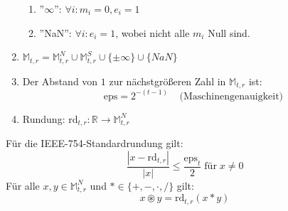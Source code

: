 \documentclass[4pt,a4paper]{scrartcl}
\begin{document}
\begin{multicols}{4}
\begin{enumerate}[label=$\bullet$]
\begin{enumerate}[label=-]
\item ''$\infty$'': $\forall i: m_i=0, e_i=1$
\item ''NaN'': $\forall i: e_i=1$, wobei nicht alle $m_i$ Null sind.
\end{enumerate}
\item $\mathbb{M}_{t,r}=\mathbb{M}_{t,r}^N\cup\mathbb{M}_{t,r}^S\cup\{\pm\infty\}\cup\{NaN\}$
\item Der Abstand von $1$ zur nächstgrößeren Zahl in $\mathbb{M}_{t,r}$ ist:
\begin{equation*}
\text{eps}=2^{-(t-1)}\;\;\;\;\text{(Maschinengenauigkeit)}
\end{equation*}
\item Rundung: $\text{rd}_{t,r}:\mathbb{R}\rightarrow\mathbb{M}_{t,r}^N$
\end{enumerate}
Für die IEEE-754-Standardrundung gilt:
\begin{equation*}
\frac{|x-\text{rd}_{t,r}|}{|x|}\leq\frac{\text{eps}_t}{2}\;\text{für}\;x\neq 0
\end{equation*}
Für alle $x,y\in\mathbb{M}_{t,r}^N$ und $*\in\{+,-,\cdot,/\}$ gilt:
\begin{equation*}
x\circledast y=\text{rd}_{t,r}(x*y)
\end{equation*}


\end{multicols}
\end{document}
